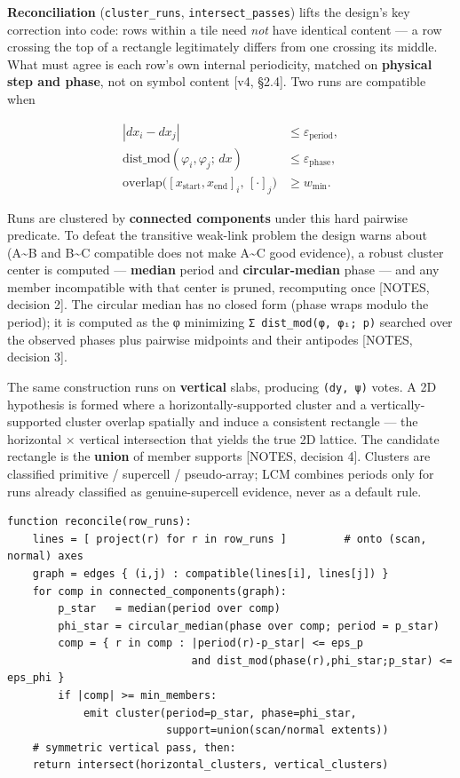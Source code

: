 \documentclass[
  11pt,
]{article}
\begin{document}
\textbf{Reconciliation} (\texttt{cluster\_runs},
\texttt{intersect\_passes}) lifts the design's key correction into code:
rows within a tile need \emph{not} have identical content --- a row
crossing the top of a rectangle legitimately differs from one crossing
its middle. What must agree is each row's own internal periodicity,
matched on \textbf{physical step and phase}, not on symbol content
{[}v4, §2.4{]}. Two runs are compatible when

\[\begin{aligned}
|dx_i - dx_j| &\le \varepsilon_{\text{period}}, \\
\mathrm{dist\_mod}(\varphi_i, \varphi_j;\, dx) &\le \varepsilon_{\text{phase}}, \\
\mathrm{overlap}\big([x_{\text{start}}, x_{\text{end}}]_i,\, [\cdot]_j\big) &\ge w_{\min}.
\end{aligned}\]

Runs are clustered by \textbf{connected components} under this hard
pairwise predicate. To defeat the transitive weak-link problem the
design warns about (A\textasciitilde B and B\textasciitilde C compatible
does not make A\textasciitilde C good evidence), a robust cluster center
is computed --- \textbf{median} period and \textbf{circular-median}
phase --- and any member incompatible with that center is pruned,
recomputing once {[}NOTES, decision 2{]}. The circular median has no
closed form (phase wraps modulo the period); it is computed as the φ
minimizing \texttt{Σ\ dist\_mod(φ,\ φᵢ;\ p)} searched over the observed
phases plus pairwise midpoints and their antipodes {[}NOTES, decision
3{]}.

The same construction runs on \textbf{vertical} slabs, producing
\texttt{(dy,\ ψ)} votes. A 2D hypothesis is formed where a
horizontally-supported cluster and a vertically-supported cluster
overlap spatially and induce a consistent rectangle --- the horizontal ×
vertical intersection that yields the true 2D lattice. The candidate
rectangle is the \textbf{union} of member supports {[}NOTES, decision
4{]}. Clusters are classified primitive / supercell / pseudo-array; LCM
combines periods only for runs already classified as genuine-supercell
evidence, never as a default rule.

\begin{verbatim}
function reconcile(row_runs):
    lines = [ project(r) for r in row_runs ]         # onto (scan, normal) axes
    graph = edges { (i,j) : compatible(lines[i], lines[j]) }
    for comp in connected_components(graph):
        p_star   = median(period over comp)
        phi_star = circular_median(phase over comp; period = p_star)
        comp = { r in comp : |period(r)-p_star| <= eps_p
                             and dist_mod(phase(r),phi_star;p_star) <= eps_phi }
        if |comp| >= min_members:
            emit cluster(period=p_star, phase=phi_star,
                         support=union(scan/normal extents))
    # symmetric vertical pass, then:
    return intersect(horizontal_clusters, vertical_clusters)
\end{verbatim}
\end{document}
